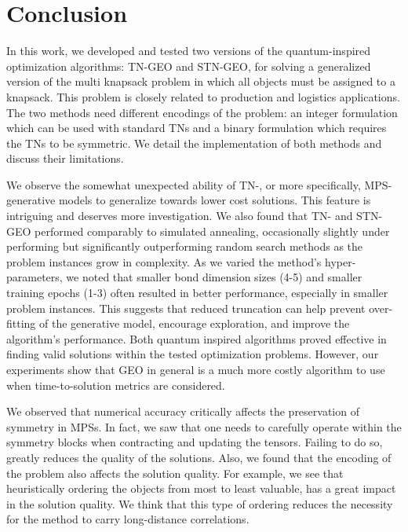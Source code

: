 \section{Conclusion}\label{sec:conclusion}
In this work, we developed and tested two versions of the quantum-inspired optimization algorithms: TN-GEO and STN-GEO, for solving a generalized version of the multi knapsack problem in which all objects must be assigned to a knapsack. This problem is closely related to production and logistics applications. The two methods need different encodings of the problem: an integer formulation which can be used with standard TNs and a binary formulation which requires the TNs to be symmetric. We detail the implementation of both methods and discuss their limitations.

We observe the somewhat unexpected ability of TN-, or more specifically, MPS-generative models to generalize towards lower cost solutions. This feature is intriguing and deserves more investigation. We also found that TN- and STN-GEO performed comparably to simulated annealing, occasionally slightly under performing but significantly outperforming random search methods as the problem instances grow in complexity. As we varied the method's hyper-parameters, we noted that smaller bond dimension sizes (4-5) and smaller training epochs (1-3) often resulted in better performance, especially in smaller problem instances. This suggests that reduced truncation can help prevent over-fitting of the generative model, encourage exploration, and improve the algorithm's performance. Both quantum inspired algorithms proved effective in finding valid solutions within the tested optimization problems. However, our experiments show that GEO in general is a much more costly algorithm to use when time-to-solution metrics are considered.

We observed that numerical accuracy critically affects the preservation of symmetry in MPSs. In fact, we saw that one needs to carefully operate within the symmetry blocks when contracting and updating the tensors. Failing to do so, greatly reduces the quality of the solutions. Also, we found that the encoding of the problem also affects the solution quality. For example, we see that heuristically ordering the objects from most to least valuable, has a great impact in the solution quality. We think that this type of ordering reduces the necessity for the method to carry long-distance correlations. 

